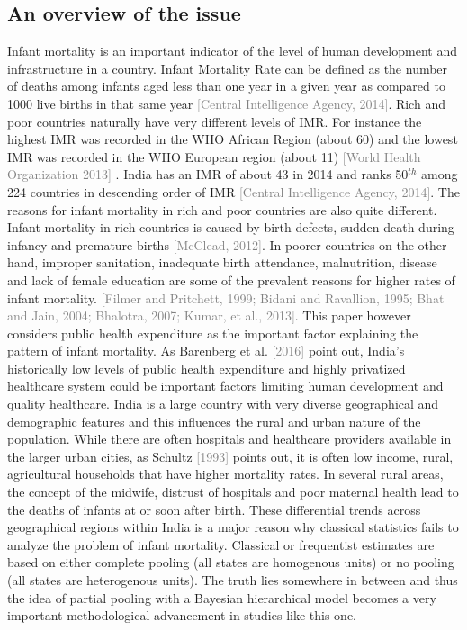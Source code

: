 \documentclass{article}
\begin{document}
\subsection{An overview of the issue}
Infant mortality is an important indicator of the level of human development and infrastructure in a country. Infant Mortality Rate can be defined as the number of deaths among infants aged less than one year in a given year as compared to 1000 live births in that same year \textcolor{gray}{[Central Intelligence Agency, 2014]}. Rich and poor countries naturally have very different levels of IMR. For instance the highest IMR was recorded in the WHO African Region (about 60) and the lowest IMR was recorded in the WHO European region (about 11) \textcolor{gray}{[World Health Organization 2013]} . India has an IMR of about 43 in 2014 and ranks 50$^{th}$ among 224 countries in descending order of IMR \textcolor{gray}{[Central Intelligence Agency, 2014]}. The reasons for infant mortality in rich and poor countries are also quite different. Infant mortality in rich countries is caused by birth defects, sudden death during infancy and premature births \textcolor{gray}{[McClead, 2012]}. In poorer countries on the other hand, improper sanitation, inadequate birth attendance, malnutrition, disease and lack of female education are some of the prevalent reasons for higher rates of infant mortality. \textcolor{gray}{[Filmer and Pritchett, 1999; Bidani and Ravallion, 1995; Bhat and Jain, 2004; Bhalotra, 2007; Kumar, et al., 2013]}. This paper however considers public health expenditure as the important factor explaining the pattern of infant mortality. As Barenberg et al. \textcolor{gray}{[2016]} point out, India's historically low levels of public health expenditure and highly privatized healthcare system could be important factors limiting human development and quality healthcare. India is a large country with very diverse geographical and demographic features and this influences the rural and urban nature of the population. While there are often hospitals and healthcare providers available in the larger urban cities, as Schultz \textcolor{gray}{[1993]} points out, it is often low income, rural, agricultural households that have higher mortality rates. In several rural areas, the concept of the midwife, distrust of hospitals and poor maternal health lead to the deaths of infants at or soon after birth. These differential trends across geographical regions within India is a major reason why classical statistics fails to analyze the problem of infant mortality. Classical or frequentist estimates are based on either complete pooling (all states are homogenous units) or no pooling (all states are heterogenous units). The truth lies somewhere in between and thus the idea of partial pooling with a Bayesian hierarchical model becomes a very important methodological advancement in studies like this one. 
\end{document}
